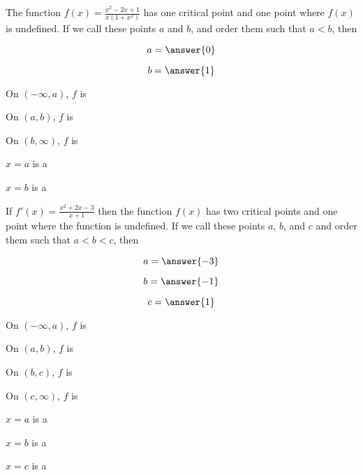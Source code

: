 \documentclass[handout]{ximera}
\begin{document}
\begin{exercise}
The function $f(x) =\frac{x^2-2x+1}{x(1+x^2)}$ has one critical
point and one point where $f(x)$ is undefined.  If we call these  points $a$ and $b$, and order them
such that $a < b$, then

$$
a = \answer{0}
$$

$$
b=\answer{1}
$$

On $(-\infty,a)$, $f$ is 

On $(a,b)$, $f$ is 

On $(b,\infty)$, $f$ is 


$x=a$ is a 

$x=b$ is a 

\end{exercise}


\begin{exercise}
If $f'(x) =\frac{x^2+2x-3}{x+1}$ then the function $f(x)$ has two critical points and one point where the function is undefined.
If we call these points $a$, $b$, and $c$ and order them such
that $a < b < c$, then

$$
a = \answer{-3}
$$

$$
b=\answer{-1}
$$

$$
c=\answer{1}
$$



On $(-\infty,a)$, $f$ is 

On $(a,b)$, $f$ is 

On $(b,c)$, $f$ is 

On $(c,\infty)$, $f$ is 


$x=a$ is a 

$x=b$ is a 

$x=c$ is a 

\end{exercise}
\end{document}
